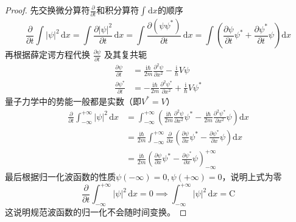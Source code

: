 \begin{proof}
    先交换微分算符$\frac{\partial }{\partial t}$和积分算符$\int_{}^{}\mathrm{d}x$的顺序
    $$
        \frac{\partial }{\partial t}\int|\psi|^2 \,\mathrm{d}x
        =\int\frac{\partial |\psi|^2}{\partial t} \,\mathrm{d}x
        =\int\frac{\partial (\psi\psi^*)}{\partial t} \,\mathrm{d}x
        =\int\left(\frac{\partial \psi}{\partial t}\psi^*+\frac{\partial \psi^*}{\partial t}\psi\right)\mathrm{d}x
    $$
    再根据薛定谔方程代换 $\frac{\partial \psi}{\partial t}$ 及其复共轭
    $$
        \begin{aligned}
            \frac{\partial \psi}{\partial t}   & = \frac{\mathrm{i}\hbar}{2m}\frac{\partial^2\psi}{\partial x^2}-\frac{\mathrm{i}}{\hbar}V\psi      \\
            \frac{\partial \psi^*}{\partial t} & = -\frac{\mathrm{i}\hbar}{2m}\frac{\partial^2\psi^*}{\partial x^2}+\frac{\mathrm{i}}{\hbar}V\psi^*
        \end{aligned}
    $$
    量子力学中的势能一般都是实数（即$V^*=V$）
    $$
        \begin{aligned}
            \frac{\partial }{\partial t}\int_{-\infty}^{+\infty}|\psi|^2 \,\mathrm{d}x
             & =\int_{-\infty}^{+\infty}\left(\frac{\mathrm{i}\hbar}{2m}\frac{\partial^2 \psi}{\partial x^2}\psi^*-\frac{\mathrm{i}\hbar}{2m}\frac{\partial^2 \psi^*}{\partial x^2}\psi\right)\mathrm{d}x \\
             & =\frac{\mathrm{i}\hbar}{2m}\int_{-\infty}^{+\infty}\frac{\partial}{\partial x}\left(\frac{\partial \psi}{\partial x}\psi^*-\frac{\partial \psi^*}{\partial x}\psi\right)\mathrm{d}x        \\
             & =\frac{\mathrm{i}\hbar}{2m}\left(\frac{\partial \psi}{\partial x}\psi^*-\frac{\partial \psi^*}{\partial x}\psi\right)_{-\infty}^{+\infty}
        \end{aligned}
    $$
    最后根据归一化波函数的性质$\psi(-\infty)=0,\psi(+\infty)=0$，说明上式为零
    $$
        \frac{\partial }{\partial t}\int_{-\infty}^{+\infty}|\psi|^2 \,\mathrm{d}x=0
        \implies
        \int_{-\infty}^{+\infty}|\psi|^2 \,\mathrm{d}x = \mathrm{C}
    $$
    这说明规范波函数的归一化不会随时间变换。
\end{proof}


